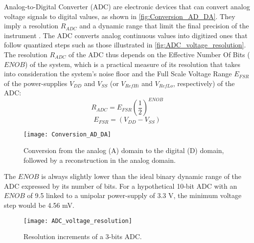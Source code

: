 Analog-to-Digital Converter (ADC) are electronic devices that can convert analog voltage signals to digital values, as shown in \autoref{fig:Conversion_AD_DA}. They imply a resolution $R_{ADC}$ and a dynamic range that limit the final precision of the instrument \cite{horowitz1989art}. The ADC converts analog continuous values into digitized ones that follow quantized steps such as those illustrated in \autoref{fig:ADC_voltage_resolution}. The resolution  $R_{ADC}$ of the ADC thus depends on the Effective Number Of Bits ($ENOB$)\cite{leHuy2004circuits} of the system, which is a practical measure of its resolution that takes into consideration the system’s noise floor and the Full Scale Voltage Range $E_{FSR}$ of the power-supplies $V_{DD}$ and $V_{SS}$ (or $V_{RefHi}$ and $V_{RefLo}$, respectively) of the ADC:
\begin{equation}
   R_{ADC} = E_{FSR} (\frac{1}{2})^{ENOB}
\end{equation}
\begin{equation}
   E_{FSR} = (V_{DD}-V_{SS})
\end{equation}
\begin{figure}[h]
    \centering
    \texttt{[image: Conversion\_AD\_DA]}
    \caption{Conversion from the analog (A) domain to the digital (D) domain, followed by a reconstruction in the analog domain.}
    \label{fig:Conversion_AD_DA}
\end{figure}
The $ENOB$ is always slightly lower than the ideal binary dynamic range of the ADC expressed by its number of bits. For a hypothetical 10-bit ADC with an $ENOB$ of 9.5 linked to a unipolar power-supply of 3.3 V, the minimum voltage step would be 4.56 mV. \par
\begin{figure}[h]
    \centering
    \texttt{[image: ADC\_voltage\_resolution]}
    \caption{Resolution increments of a 3-bits ADC.}
    \label{fig:ADC_voltage_resolution}
\end{figure}